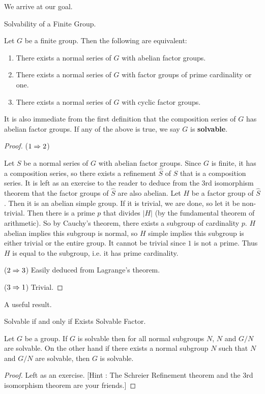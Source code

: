 \documentclass[../../book.tex]{subfiles}
\begin{document}
We arrive at our goal.

\begin{dfn} Solvability of a Finite Group.
    
    Let $G$ be a finite group.
    Then the following are equivalent: \begin{enumerate}
        \item There exists a normal series of $G$ with abelian factor groups.
        \item There exists a normal series of $G$ 
        with factor groups of prime cardinality or one.
        \item There exists a normal series of $G$ with cyclic factor groups.
    \end{enumerate}
    It is also immediate from the first definition that the composition series
    of $G$ has abelian factor groups.
    If any of the above is true, we say $G$ is \textbf{solvable}. 
    
\end{dfn}
\begin{proof}
    
    ($1 \Rightarrow 2$)
        
        Let $S$ be a normal series of $G$ with abelian factor groups.
        Since $G$ is finite, it has a composition series,
        so there exists a refinement $\hat{S}$ of $S$ that is a composition series.
        It is left as an exercise to the reader 
        to deduce from the 3rd isomorphism theorem
        that the factor groups of $\hat{S}$ are also abelian.
        Let $H$ be a factor group of $\hat{S}$. 
        Then it is an abelian simple group. 
        If it is trivial, we are done, so let it be non-trivial.
        Then there is a prime $p$ that divides $|H|$ 
        (by the fundamental theorem of arithmetic).
        So by Cauchy's theorem, there exists a subgroup of cardinality $p$.
        $H$ abelian implies this subgroup is normal, 
        so $H$ simple implies this subgroup is either trivial or the entire group.
        It cannot be trivial since $1$ is not a prime.
        Thus $H$ is equal to the subgroup, i.e. it has prime cardinality. 
        
    ($2 \Rightarrow 3$) Easily deduced from Lagrange's theorem.
    
    ($3 \Rightarrow 1$) Trivial.
\end{proof}
A useful result.
\begin{lem} Solvable if and only if Exists Solvable Factor.
    
    Let $G$ be a group.
    If $G$ is solvable then for all normal subgroups $N$,
    $N$ and $G / N$ are solvable.
    On the other hand if there exists a normal subgroup $N$ such that 
    $N$ and $G / N$ are solvable,
    then $G$ is solvable.
    
\end{lem}
\begin{proof}
    
    Left as an exercise. 
    [Hint : The Schreier Refinement theorem
    and the 3rd isomorphism theorem are your friends.]
    
\end{proof}
\end{document}
